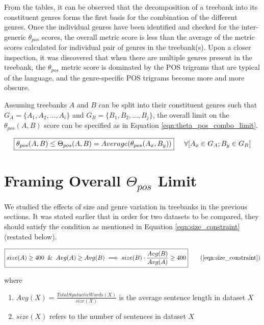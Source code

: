 From the tables, it can be observed that the decomposition of a treebank into its constituent genres forms the first basis for the combination of the different genres. Once the individual genres have been identified and checked for the inter-generic $\theta_{pos}$ scores, the overall metric score is less than the average of the metric scores calculated for individual pair of genres in the treebank(s). Upon a closer inspection, it was discovered that when there are multiple genres present in the treebank, the $\theta_{pos}$ metric score is dominated by the POS trigrams that are typical of the language, and the genre-specific POS trigrams become more and more obscure.

Assuming treebanks $A$ and $B$ can be split into their constituent genres such that $G_{A} = \{A_{1}, A_{2}, ... , A_{i}\}$ and $G_{B} = \{B_{1}, B_{2}, ... , B_{j}\}$, the overall limit on the $\theta_{pos}(A, B)$ score can be specified as in Equation \ref{eqn:theta_pos_combo_limit}.

\begin{equation}
    \boxed{\theta_{pos}(A, B) \leq \Theta_{pos}(A, B) = Average(\theta_{pos}(A_{x}, B_{y}))} \hspace{5mm} \forall [A_{x} \in G_{A}; B_{y} \in G_{B}]
\label{eqn:theta_pos_combo_limit}
\end{equation}

\section{Framing Overall \texorpdfstring{$\Theta_{pos}$}{Theta\_pos} Limit}
\label{sec:pos-harmony-calculations}

We studied the effects of size and genre variation in treebanks in the previous sections. It was stated earlier that in order for two datasets to be compared, they should satisfy the condition as mentioned in Equation \ref{eqn:size_constraint} (restated below).

\begin{equation}
\boxed{size(A) \geq 400 \And Avg(A) \geq Avg(B) \implies size(B) \cdot \frac{Avg(B)}{Avg(A)} \geq 400} \tag{\ref{eqn:size_constraint}}
\end{equation}

 where

\begin{enumerate}
    \item $Avg(X) = \frac{Total Syntactic Words(X)}{size(X)}$ is the average sentence length in dataset $X$
    \item $size(X)$ refers to the number of sentences in dataset $X$
\end{enumerate}


